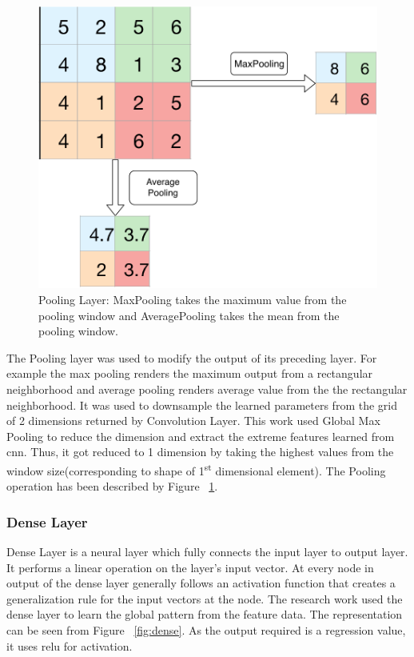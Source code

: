   \begin{figure}[H] \centering
    \includegraphics[width=.5\linewidth]{mainmatter/3-Methodology/images/pooling.pdf}
    \caption[Pooling Layer]{Pooling Layer: MaxPooling takes the maximum value from the pooling window and AveragePooling takes the mean from the pooling window.}
    \label{fig:pool_layer}
  \end{figure}

  
  The Pooling layer was used to modify the output of its preceding layer. For example the max pooling renders the maximum output from a rectangular neighborhood and average pooling renders average value from the the rectangular neighborhood. It was used to downsample the learned parameters from the grid of 2 dimensions returned by Convolution Layer. This work used Global Max Pooling to reduce the dimension and extract the extreme features learned from \acrshort{cnn}. Thus, it got reduced to 1 dimension by taking the highest values from the window size(corresponding to shape of 1\textsuperscript{st} dimensional element). The Pooling operation has been described by Figure ~\ref{fig:pool_layer}.

  
  \subsubsection{Dense Layer}
  Dense Layer is a neural layer which fully connects the input layer to output layer. It performs a linear operation on the layer's input vector. At every node in output of the dense layer generally follows an activation function that creates a generalization rule for the input vectors at the node. The research work used the dense layer to learn the global pattern from the feature data. The representation can be seen from Figure ~\ref{fig:dense}. As the output required is a regression value, it uses relu for activation.

  
  
